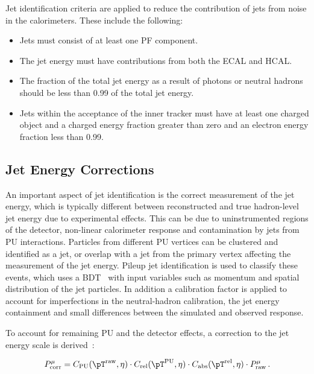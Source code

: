 Jet identification criteria are applied to reduce the contribution of jets from
noise in the calorimeters. These include the following:
\begin{itemize}
\item Jets must consist of at least one \ac{PF} component. 
\item The jet energy must have contributions
from both the \ac{ECAL} and \ac{HCAL}.
\item The fraction of the total jet energy as a result of photons or neutral
hadrons should be less than 0.99 of the total jet energy.
\item Jets within the acceptance of the inner tracker must have at least one
charged object and a charged energy fraction greater than zero and an electron
energy fraction less than 0.99. 
\end{itemize}

\subsection{Jet Energy Corrections}
\label{sec:JEC}

An important aspect of jet identification is the correct measurement of the jet
energy, which is typically different between reconstructed and true hadron-level jet energy
due to experimental effects. This can be due to uninstrumented regions of the
detector, non-linear calorimeter response and contamination by jets from \ac{PU}
interactions. Particles from different \ac{PU} vertices can be clustered and identified as a
jet, or overlap with a jet from the primary vertex affecting the measurement of the jet energy.
Pileup jet identification \cite{CMS-PAS-JME-13-005} is used to classify these events, which uses a 
\ac{BDT}~\cite{TMVA} with input variables such as
momentum and spatial distribution of the jet particles. In addition
a calibration factor is applied to account for imperfections in the
neutral-hadron calibration, the jet energy containment and small differences
between the simulated and observed response.

To account for remaining \ac{PU} and the detector effects, a correction to the jet energy
scale is derived~\cite{CMS-JME-10-011}:


\begin{equation}
P_{\text{corr}}^{\mu} = C_{\text{PU}}(\pT^{\text{raw}},\eta) \cdot
C_{\text{rel}}(\pT^{\text{PU}},\eta) \cdot C_{\text{abs}}(\pT^{\text{rel}},\eta) \cdot
P_{\text{raw}}^{\mu}\, .
\end{equation}

